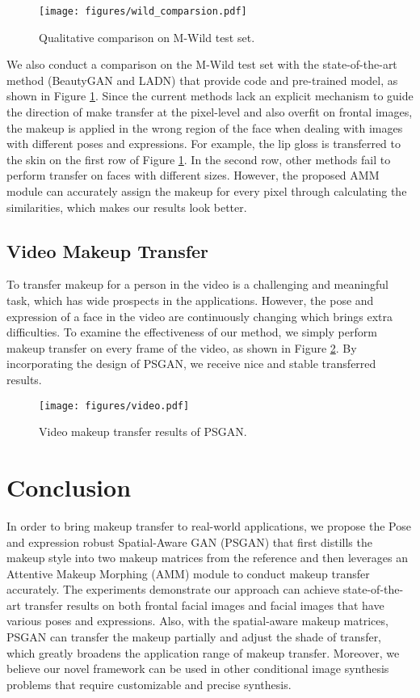 \begin{figure}[!t]
    \texttt{[image: figures/wild\_comparsion.pdf]}
    \caption{Qualitative comparison on M-Wild test set.}
    \label{wild}
    \vspace{-3mm}
\end{figure}

We also conduct a comparison on the M-Wild test set with the state-of-the-art method (BeautyGAN and LADN) that provide code and pre-trained model, as shown in Figure \ref{wild}.
Since the current methods lack an explicit mechanism to guide the direction of make transfer at the pixel-level and also overfit on frontal images, the makeup is applied in the wrong region of the face when dealing with images with different poses and expressions. For example, the lip gloss is transferred to the skin on the first row of Figure \ref{wild}. In the second row, other methods fail to perform transfer on faces with different sizes. However, the proposed AMM module can accurately assign the makeup for every pixel through calculating the similarities, which makes our results look better.

\subsection{Video Makeup Transfer}
To transfer makeup for a person in the video is a challenging and meaningful task, which has wide prospects in the applications. However, the pose and expression of a face in the video are continuously changing which brings extra difficulties. To examine the effectiveness of our method, we simply perform makeup transfer on every frame of the video, as shown in Figure \ref{video}. By incorporating the design of PSGAN, we receive nice and stable transferred results.

\begin{figure}[!t]
   \texttt{[image: figures/video.pdf]}
   \caption{Video makeup transfer results of PSGAN.}
   \label{video}
   \vspace{-2mm}
\end{figure}
 
\section{Conclusion}
In order to bring makeup transfer to real-world applications, we propose the Pose and expression robust Spatial-Aware GAN (PSGAN) that first distills the makeup style into two makeup matrices from the reference and then leverages an Attentive Makeup Morphing (AMM) module to conduct makeup transfer accurately. 
The experiments demonstrate our approach can achieve state-of-the-art transfer results on both frontal facial images and facial images that have various poses and expressions. Also, with the spatial-aware makeup matrices, PSGAN can transfer the makeup partially and adjust the shade of transfer, which greatly broadens the application range of makeup transfer. Moreover, we believe our novel framework can be used in other conditional image synthesis problems that require customizable and precise synthesis.

{\small
}

